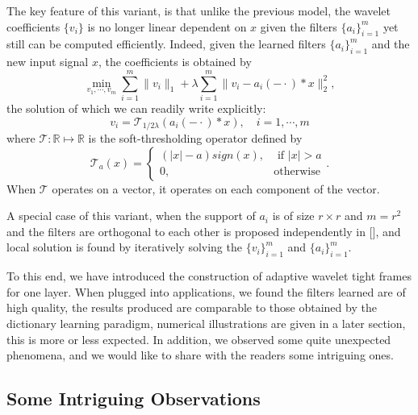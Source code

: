 \documentclass[a4paper]{article}
\begin{document}
The key feature of this variant, is that unlike the previous model, the wavelet coefficients $\{v_i\}$ is no longer linear dependent on $x$ given the filters $\{a_i\}_{i=1}^m$ yet still can be computed efficiently. Indeed, given the learned filters $\{a_i\}_{i=1}^m$ and the new input signal $x$, the coefficients is obtained by 
\[
	\min_{v_1,\cdots,v_m} \sum_{i=1}^m \|v_i\|_1 + \lambda \sum_{i=1}^m \|v_i - a_i(-\cdot)*x\|_2^2,
\]
the solution of which we can readily write explicitly:
\[
	v_i = \mathcal{T}_{1/2\lambda}( a_i(-\cdot)*x),\quad i=1,\cdots,m
\]
where $\mathcal{T}: \mathbb{R}\mapsto \mathbb{R}$ is the soft-thresholding operator defined by
\[
	\mathcal{T}_a(x)=\left\{ \begin{array}{lr}  (|x|-a)sign(x), &\textrm{ if } |x| > a \\0, &\textrm{otherwise}\end{array}\right . .
\]
When $\mathcal{T}$ operates on a vector, it operates on each component of the vector.


A special case of this variant, when the support of $a_i$ is of size $r\times r$ and $m=r^2$ and the filters are orthogonal to each other is proposed independently in [], and local solution is found by iteratively solving the $\{v_i\}_{i=1}^m$ and $\{a_i\}_{i=1}^m$.

To this end, we have introduced the construction of adaptive wavelet tight frames for one layer. When plugged into applications, we found the filters learned are of high quality, the results produced are comparable to those obtained by the dictionary learning paradigm, numerical illustrations are given in a later section, this is more or less expected.  In addition, we observed some quite unexpected phenomena, and we would like to share with the readers some intriguing ones.
\subsection{Some Intriguing Observations}
\end{document}
